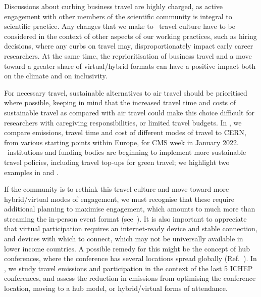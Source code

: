 \documentclass[../SustainableHEP.tex]{subfiles}
\begin{document}
Discussions about curbing business travel are highly charged, as active engagement with other members of the scientific community is integral to scientific practice. Any changes that we make to \ACR\ travel culture have to be considered in the context of other aspects of our working practices, such as hiring decisions, where any curbs on travel may, \eg disproportionately impact early career researchers. At the same time, the reprioritisation of business travel and a move toward a greater share of virtual/hybrid formats can have a positive impact both on the climate and on inclusivity.

For necessary travel, sustainable alternatives to air travel should be prioritised where possible, keeping in mind that the increased travel time and costs of sustainable travel as compared with air travel could make this choice difficult for researchers with caregiving responsibilities, or limited travel budgets.  In , we compare emissions, travel time and cost of different modes of travel to CERN, from various starting points within Europe, for CMS week in January 2022.  \ACR\ institutions and funding bodies are beginning to implement more sustainable travel policies, including travel top-ups for green travel; we highlight two examples in  and .

If the community is to rethink this travel culture and move toward more hybrid/virtual modes of engagement, we must recognise that these require additional planning to maximise engagement, which amounts to much more than streaming the in-person event format (see~). It is also important to appreciate that virtual participation requires an internet-ready device and stable connection, and devices with which to connect, which may not be universally available in lower income countries. A possible remedy for this might be the concept of hub conferences, where the conference has several locations spread globally (\eg Ref.~\cite{Parncutt}).  In , we study travel emissions and participation in the context of the last 5 ICHEP conferences, and assess the reduction in emissions from optimising the conference location, moving to a hub model, or hybrid/virtual forms of attendance.

\end{document}
